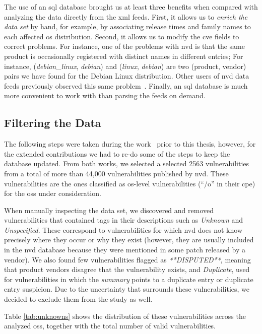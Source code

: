 The use of an \gls{sql} database brought us at least three benefits when compared with analyzing the data directly from the \gls{xml} feeds.
First, it allows us to \emph{enrich the data set} by hand, for example, by associating release times and family names to each affected \gls{os} distribution.
Second, it allows us to modify the \gls{cve} fields to correct problems.
For instance, one of the problems with \gls{nvd} is that the same product is occasionally registered with distinct names in different entries;
For instance, (\textit{debian\_linux}, \textit{debian}) and (\textit{linux}, \textit{debian}) are two (product, vendor) pairs we have found for the Debian Linux distribution.
Other users of \gls{nvd} data feeds previously observed this same problem~\cite{cvedetails}.
Finally, an \gls{sql} database is much more convenient to work with than parsing the feeds on demand.

\subsection{Filtering the Data}\label{filtering_data}
The following steps were taken during the work~\cite{Garcia:2012} prior to this thesis, however, for the extended contributions we had to re-do some of the steps to keep the database updated.
From both works, we selected a  selected 2563 vulnerabilities from a total of more than 44,000 vulnerabilities published by \gls{nvd}.
These vulnerabilities are the ones classified as \gls{os}-level vulnerabilities (``/o'' in their \gls{cpe}) for the \glspl{os} under consideration.

When manually inspecting the data set, we discovered and removed vulnerabilities that contained tags in their descriptions such as \emph{Unknown} and \emph{Unspecified}. 
These correspond to vulnerabilities for which \gls{nvd} does not know precisely where they occur or why they exist (however, they are usually included in the \gls{nvd} database because they were mentioned in some patch released by a vendor). 
We also found few vulnerabilities flagged as \emph{**DISPUTED**}, meaning that product vendors disagree that the vulnerability exists, and \emph{Duplicate}, used for vulnerabilities in which the \emph{summary} points to a duplicate entry or duplicate entry suspicion.
Due to the uncertainty that surrounds these vulnerabilities, we decided to exclude them from the study as well.

Table \ref{tab:unknowns} shows the distribution of these vulnerabilities across the analyzed \glspl{os}, together with the total number of valid vulnerabilities.

